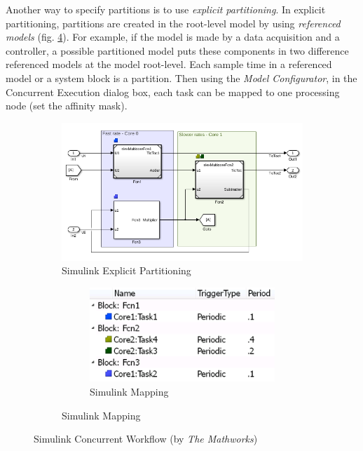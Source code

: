 \par Another way to specify partitions is to use \emph{explicit partitioning}. In explicit partitioning, partitions are created in the root-level model by using \emph{referenced models} (fig. \ref{fig:SimulinkTaskProfiling}). For example, if the model is made by a data acquisition and a controller, a possible partitioned model puts these components in two difference referenced models at the model root-level. Each sample time in a referenced model or a system block is a partition. Then using the \emph{Model Configurator}, in the Concurrent Execution dialog box, each task can be mapped to one processing node (set the affinity mask).
\begin{figure}
  \begin{subfigure}{0.65\textwidth}
    \centering
    \includegraphics[width=1\textwidth]{slexMulticorePartitioning}
    \caption{Simulink Explicit Partitioning}
    \label{fig:slexPartitioning}
  \end{subfigure}%
  \begin{subfigure}{0.35\textwidth}
    \begin{subfigure}{\textwidth}
      \centering
      \includegraphics[width=1\textwidth]{slexMulticoreMapping}
      \caption{Simulink Mapping}
      \label{fig:slexMapping}
    \end{subfigure}
  \end{subfigure}
  \caption{Simulink Concurrent Workflow (by \emph{The Mathworks})}
  \label{fig:SimulinkTaskProfiling}
\end{figure}

